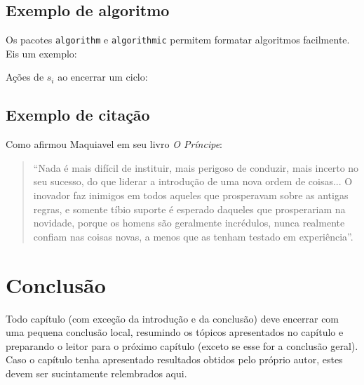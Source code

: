 



\subsection{Exemplo de algoritmo}

Os pacotes \texttt{algorithm} e \texttt{algorithmic} permitem formatar algoritmos facilmente. Eis um exemplo:

\begin{algorithm}[H]
\caption{Ações de $s_i$ ao encerrar um ciclo:}
\label{alg:on-period-ending}
\begin{small}
\begin{algorithmic}[1]
  \ENDIF
\ENDFOR
\end{algorithmic}
\end{small}
\end{algorithm}
 

\subsection{Exemplo de citação}

Como afirmou Maquiavel em seu livro \emph{O Príncipe}:

\begin{quote}
``Nada é mais difícil de instituir, mais perigoso de conduzir, mais incerto no seu sucesso, do que liderar a introdução de uma nova ordem de coisas... O inovador faz inimigos em todos aqueles que prosperavam sobre as antigas regras, e somente tíbio suporte é esperado daqueles que prosperariam na novidade, porque os homens são geralmente incrédulos, nunca realmente confiam nas coisas novas, a menos que as tenham testado em experiência''.
\end{quote}


\section{Conclusão}

Todo capítulo (com exceção da introdução e da conclusão) deve encerrar com uma pequena conclusão local, resumindo os tópicos apresentados no capítulo e preparando o leitor para o próximo capítulo (exceto se esse for a conclusão geral). Caso o capítulo tenha apresentado resultados obtidos pelo próprio autor, estes devem ser sucintamente relembrados aqui.

